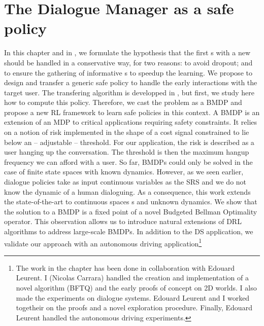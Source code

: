\chapter{The Dialogue Manager as a safe policy }
\label{chapter:nips}

In this chapter and in , we formulate the hypothesis that the first s with a new  should be handled in a conservative way, for two reasons: to avoid  dropout; and to ensure the gathering of informative s to speedup the learning. We propose to design and transfer a  generic safe policy to handle the early interactions with the target user. The transfering algorithm is developped in , but first, we study here how to compute this policy. Therefore, we cast the  problem as a \acrfull{BMDP} and propose a new \acrfull{RL} framework to learn safe policies in this context. A \gls{BMDP} is an extension of an \acrfull{MDP} to critical applications requiring safety constraints. It relies on a notion of risk implemented in the shape of a cost signal constrained to lie below an -- adjustable -- threshold. For our application, the risk is described as a user hanging up the conversation. The threshold is then the maximum hangup frequency we can afford with a user. So far, \glspl{BMDP} could only be solved in the case of finite state spaces with known dynamics. However, as we seen earlier, dialogue policies take as input continuous variables as the \gls{SRS} and we do not know the dynamic of a human dialoguing. As a consequence, this work extends the state-of-the-art to continuous spaces s and unknown dynamics. We show that the solution to a \gls{BMDP} is a fixed point of a novel Budgeted Bellman Optimality operator. This observation allows us to introduce natural extensions of \acrfull{DRL} algorithms to address large-scale \glspl{BMDP}. In addition to the \gls{DS} application, we validate our approach with an autonomous driving application\footnote{The work in the chapter has been done in collaboration with Edouard Leurent. I (Nicolas Carrara) handled the creation and implementation of a novel algorithm (BFTQ) and the early proofs of concept on 2D worlds. I also made the experiments on dialogue systems. Edouard Leurent and I worked togetheir on the proofs and a novel exploration procedure. Finally, Edouard Leurent handled the autonomous driving experiments.}


